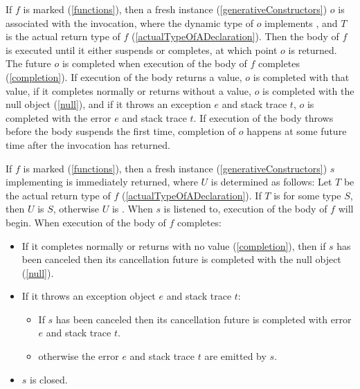 \documentclass[makeidx]{article}
\begin{document}
\LMHash{}%
If $f$ is marked \ASYNC{} (\ref{functions}),
then a fresh instance (\ref{generativeConstructors}) $o$ is associated with the invocation,
where the dynamic type of $o$ implements ,
and $T$ is the actual return type of $f$ (\ref{actualTypeOfADeclaration}).
Then the body of $f$ is executed until it either suspends or completes, at which point $o$ is returned.
The future $o$ is completed when execution of the body of $f$ completes (\ref{completion}).
If execution of the body returns a value, $o$ is completed with that value,
if it completes normally or returns without a value,
$o$ is completed with the null object (\ref{null}),
and if it throws an exception $e$ and stack trace $t$,
$o$ is completed with the error $e$ and stack trace $t$.
If execution of the body throws before the body suspends the first time,
completion of $o$ happens at some future time after the invocation has returned.

\LMHash{}%
If $f$ is marked \code{\ASYNC*} (\ref{functions}),
then a fresh instance (\ref{generativeConstructors}) $s$
implementing  is immediately returned,
where $U$ is determined as follows:
Let $T$ be the actual return type of $f$ (\ref{actualTypeOfADeclaration}).
If $T$ is  for some type $S$, then $U$ is $S$,
otherwise $U$ is .
When $s$ is listened to, execution of the body of $f$ will begin.
When execution of the body of $f$ completes:
\begin{itemize}
\item If it completes normally or returns with no value (\ref{completion}), then if $s$ has been canceled then its cancellation future is completed with the null object (\ref{null}).
\item If it throws an exception object $e$ and stack trace $t$:
  \begin{itemize}
  \item If $s$ has been canceled then its cancellation future is completed with error $e$ and stack trace $t$.
  \item otherwise the error $e$ and stack trace $t$ are emitted by $s$.
  \end{itemize}
\item $s$ is closed.
\end{itemize}
\end{document}
